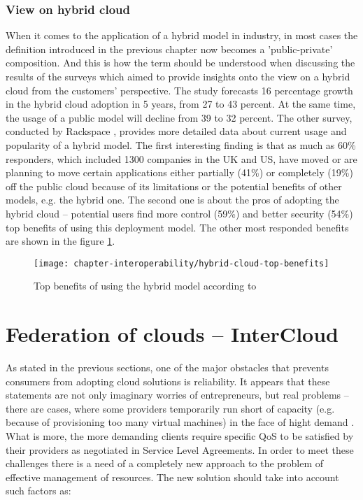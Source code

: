 \subsubsection*{View on hybrid cloud}
When it comes to the application of a hybrid model in industry, in most cases the definition introduced in the previous chapter now becomes a 'public-private' composition. And this is how the term should be understood when discussing the results of the surveys which aimed to provide insights onto the view on a hybrid cloud from the customers' perspective.
The study \cite{NBSurvey13} forecasts 16 percentage growth in the hybrid cloud adoption in 5 years, from 27 to 43 percent. At the same time, the usage of a public model will decline from 39 to 32 percent.
The other survey, conducted by Rackspace \cite{RackspaceSurvey13}, provides more detailed data about current usage and popularity of a hybrid model. The first interesting finding is that as much as 60\% responders, which included 1300 companies in the UK and US, have moved or are planning to move certain applications either partially (41\%) or completely (19\%) off the public cloud because of its limitations or the potential benefits of other models, e.g. the hybrid one. The second one is about the pros of adopting the hybrid cloud  -- potential users find more control (59\%) and better security (54\%) top benefits of using this deployment model. The other most responded benefits are shown in the figure \ref{fig:hybrid-cloud-top-benefits}.

\begin{figure}[!ht]
  \begin{center}
    \texttt{[image: chapter-interoperability/hybrid-cloud-top-benefits]}
  \end{center}
  \caption{Top benefits of using the hybrid model according to \cite{RackspaceSurvey13}}
  \label{fig:hybrid-cloud-top-benefits}
\end{figure}

\section{Federation of clouds -- InterCloud}
As stated in the previous sections, one of the major obstacles that prevents consumers from adopting cloud solutions is reliability. It appears that these statements are not only imaginary worries of entrepreneurs, but real problems -- there are cases, where some providers temporarily run short of capacity (e.g. because of provisioning too many virtual machines) in the face of hight demand \cite{Lavitt09}. What is more, the more demanding clients require specific QoS to be satisfied by their providers as negotiated in Service Level Agreements.
In order to meet these challenges there is a need of a completely new approach to the problem of effective management of resources. The new solution should take into account such factors as:

